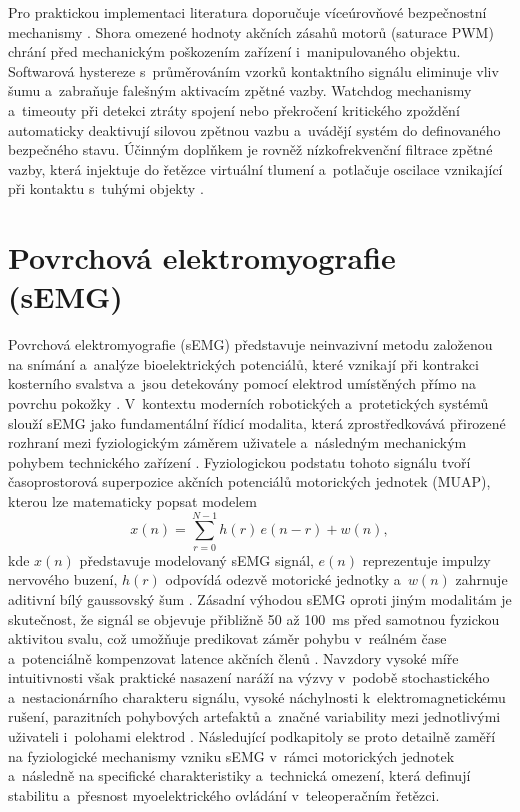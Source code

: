 Pro praktickou implementaci literatura doporučuje víceúrovňové bezpečnostní mechanismy \cite{Patel2022, Black2025, Bolarinwa2022}.
Shora omezené hodnoty akčních zásahů motorů (saturace PWM) chrání před mechanickým poškozením zařízení i~manipulovaného objektu.
Softwarová hystereze s~průměrováním vzorků kontaktního signálu eliminuje vliv šumu a~zabraňuje falešným aktivacím zpětné vazby.
Watchdog mechanismy a~timeouty při detekci ztráty spojení nebo překročení kritického zpoždění automaticky deaktivují silovou zpětnou vazbu a~uvádějí systém do definovaného bezpečného stavu.
Účinným doplňkem je rovněž nízkofrekvenční filtrace zpětné vazby, která injektuje do řetězce virtuální tlumení a~potlačuje oscilace vznikající při kontaktu s~tuhými objekty \cite{Black2025, Patel2022}.

\section{Povrchová elektromyografie (sEMG)}
Povrchová elektromyografie (sEMG) představuje neinvazivní metodu založenou na snímání a~analýze bioelektrických potenciálů, které vznikají při kontrakci kosterního svalstva a~jsou detekovány pomocí elektrod umístěných přímo na povrchu pokožky \cite{ALCAN20231026, Reaz2006, Wu2024613}.
V~kontextu moderních robotických a~protetických systémů slouží sEMG jako fundamentální řídicí modalita, která zprostředkovává přirozené rozhraní mezi fyziologickým záměrem uživatele a~následným mechanickým pohybem technického zařízení \cite{ALCAN20231026, Song2023823, Xiong2024}.
Fyziologickou podstatu tohoto signálu tvoří časoprostorová superpozice akčních potenciálů motorických jednotek (MUAP), kterou lze matematicky popsat modelem
%
\begin{equation}
    x(n) = \sum_{r=0}^{N-1} h(r)\,e(n-r) + w(n),
\end{equation}
%
kde $x(n)$ představuje modelovaný sEMG signál, $e(n)$ reprezentuje impulzy nervového buzení, $h(r)$ odpovídá odezvě motorické jednotky a~$w(n)$ zahrnuje aditivní bílý gaussovský šum \cite{Reaz2006}.
Zásadní výhodou sEMG oproti jiným modalitám je skutečnost, že signál se objevuje přibližně 50 až 100~ms před samotnou fyzickou aktivitou svalu, což umožňuje predikovat záměr pohybu v~reálném čase a~potenciálně kompenzovat latence akčních členů \cite{Song2023823, Xiong2024}.
Navzdory vysoké míře intuitivnosti však praktické nasazení naráží na výzvy v~podobě stochastického a~nestacionárního charakteru signálu, vysoké náchylnosti k~elektromagnetickému rušení, parazitních pohybových artefaktů a~značné variability mezi jednotlivými uživateli i~polohami elektrod \cite{Chowdhury2013917, DeLuca2010, Sul2025627, Song2023823}.
Následující podkapitoly se proto detailně zaměří na fyziologické mechanismy vzniku sEMG v~rámci motorických jednotek a~následně na specifické charakteristiky a~technická omezení, která definují stabilitu a~přesnost myoelektrického ovládání v~teleoperačním řetězci.
